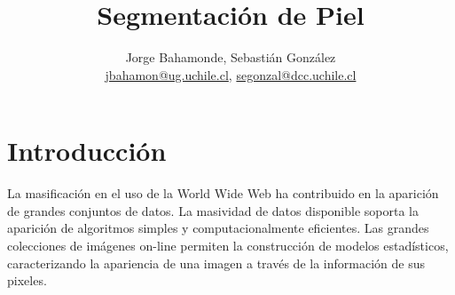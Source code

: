 \documentclass[12pt]{article}
\title{Segmentación de Piel}
\author{Jorge Bahamonde, Sebastián González\\
\small{\url{jbahamon@ug.uchile.cl}, \url{segonzal@dcc.uchile.cl}}}
\date{}
\begin{document}
\maketitle

\section{Introducción}


La masificación en el uso de la World Wide Web ha contribuido en la aparición de
grandes conjuntos de datos. La masividad de datos disponible soporta la
aparición de algoritmos simples y computacionalmente eficientes. Las grandes
colecciones de imágenes on-line permiten la construcción de modelos
estadísticos, caracterizando la apariencia de una imagen a través de la
información de sus pixeles.
\end{document}
